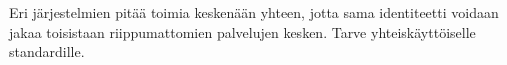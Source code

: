 \documentclass[finnish,gradu]{tktltiki}
\begin{document}
  Eri järjestelmien pitää toimia keskenään yhteen, jotta sama identiteetti voidaan jakaa toisistaan riippumattomien palvelujen kesken. Tarve yhteiskäyttöiselle standardille.








\end{document}

